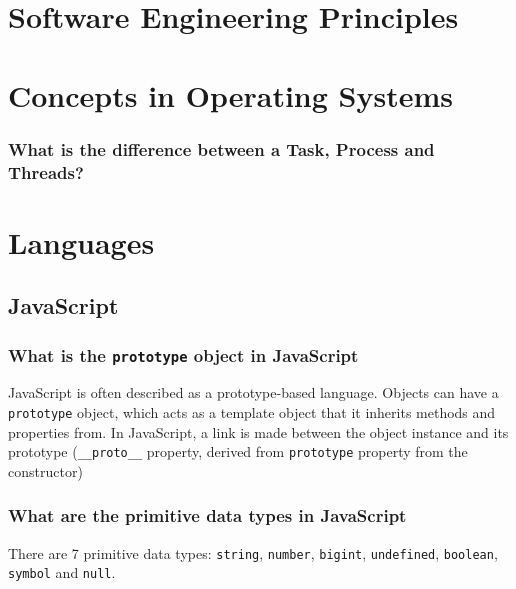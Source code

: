 \documentclass[12pt, a4paper]{article}
\newcommand{\code}[1]{\texttt{#1}}
\begin{document}
\noindent

\tableofcontents

\pagebreak

\section*{Software Engineering Principles}

\pagebreak
{}
\section*{Concepts in Operating Systems}
\subsubsection*{What is the difference between a Task, Process and Threads?}


\pagebreak
{}
\section*{Languages}
\subsection*{JavaScript}
\subsubsection*{What is the \code{prototype} object in JavaScript}
JavaScript is often described as a prototype-based language.
Objects can have a \code{prototype} object, which acts as a template object that it inherits methods and properties from.
In JavaScript, a link is made between the object instance and its prototype (\code{\_\_proto\_\_} property, derived from \code{prototype} property from the constructor)

\subsubsection*{What are the primitive data types in JavaScript}
There are 7 primitive data types: \code{string}, \code{number}, \code{bigint}, \code{undefined}, \code{boolean}, \code{symbol} and \code{null}.
\end{document}
